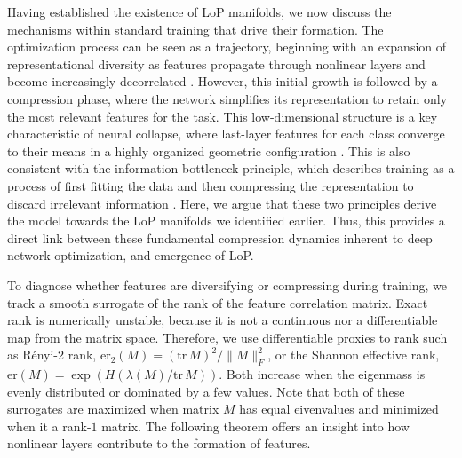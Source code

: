\documentclass{article}
\numberwithin{figure}{section}
\begin{document}
Having established the existence of LoP manifolds, we now discuss the mechanisms within standard training that drive their formation. The optimization process can be seen as a trajectory, beginning with an expansion of representational diversity as features propagate through nonlinear layers and become increasingly decorrelated \citep{poole2016exponential}. However, this initial growth is followed by a compression phase, where the network simplifies its representation to retain only the most relevant features for the task. This low-dimensional structure is a key characteristic of neural collapse, where last-layer features for each class converge to their means in a highly organized geometric configuration \citep{papyan2020prevalence}. This is also consistent with the information bottleneck principle, which describes training as a process of first fitting the data and then compressing the representation to discard irrelevant information \citep{shwartz2017opening}. Here, we argue that these two principles derive the model towards the LoP manifolds we identified earlier. Thus, this provides a direct link between these fundamental compression dynamics inherent to deep network optimization, and emergence of LoP.




To diagnose whether features are diversifying or compressing during training, we track a smooth surrogate of the rank of the feature correlation matrix. Exact rank is numerically unstable, because it is not a continuous nor a differentiable map from the matrix space. Therefore, we use differentiable proxies to rank such as Rényi-2 rank, $\mathrm{er}_2(M)=(\mathrm{tr}\,M)^2/\|M\|_F^2$, or the Shannon effective rank, $\mathrm{er}(M)=\exp(H(\lambda(M)/\mathrm{tr}\,M))$. Both increase when the eigenmass is evenly distributed or dominated by a few values. Note that both of these surrogates are maximized when matrix $M$ has equal eivenvalues and minimized when it a rank-$1$ matrix. The following theorem offers an insight into how nonlinear layers contribute to the formation of features. 
\end{document}
